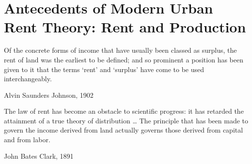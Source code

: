 \chapter{Antecedents of Modern Urban Rent Theory: Rent and Production} \label{chapter-rent}

\epigraph{Of the concrete forms of income that have usually been classed as surplus, the rent of land was the earliest to be defined; and so prominent a position has been given to it that the terms `rent' and `surplus' have come to be used interchangeably.}{Alvin Saunders Johnson, 1902 \cite{johnsonRentModernEconomic1902}}
\epigraph{The law of rent has become an obstacle to scientific progress: it has retarded the attainment of a true theory of distribution \dots %
The principle that has been made to govern the income derived from land actually governs those derived from capital and from labor. 
}{John Bates Clark, 1891 \cite{clarkDistributionDeterminedLaw1891}}

